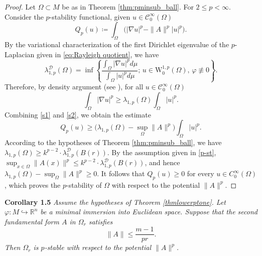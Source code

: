 \documentclass{article}
\begin{document}
\begin{proof}
Let $\Omega \subset M$ be as in Theorem \ref{thm:pminsub_ball}.
For $2 \le p < \infty$. Consider the $p$-stability functional, given $u \in \mathcal{C}_0^\infty(\Omega)$
\begin{equation}\label{s1}
    Q_p(u) \coloneq \int_{\Omega} \Big( |\nabla u|^p - \|A\|^p |u|^p \Big).
\end{equation}
By the variational characterization of the first Dirichlet eigenvalue
of the $p$-Laplacian given in \eqref{eq:Rayleigh quotient}, we have
\[
 \lambda_{1,p}^{\mathcal{D}}(\Omega)
    = \inf \left\{ \frac{\displaystyle \int_{\Omega} |\nabla u |^p d\mu} {\displaystyle \int_{\Omega} |u|^p d\mu}; \, u \in \mathrm{W}^{1,p}_0(\Omega), \, \varphi \not\equiv 0
    \right\}.
\]
Therefore, by density argument (see \cite[Corollary A.4]{le}), for all  $u \in \mathcal{C}_0^\infty(\Omega)$
\begin{equation}\label{s2}
\int_{\Omega} |\nabla u|^p \geq \lambda_{1,p}(\Omega) \int_{\Omega} |u|^p. 
\end{equation}
Combining \eqref{s1} and \eqref{s2}, we obtain the estimate
\[
Q_p(u) \geq \big( \lambda_{1,p}(\Omega) - \sup_{\Omega} \|A\|^p\big)
\int_{\Omega} |u|^p.
\]
According to the hypotheses of Theorem \ref{thm:pminsub_ball}, we have $\lambda_{1,p}(\Omega) \geq k^{p-2} \cdot \lambda_{1,p}^{\mathcal D}(B(r))$. By the assumption given in \eqref{p-st}, $\sup_{x \in \Omega} \|A(x)\|^p \leq k^{p-2} \cdot \lambda_{1,p}^{\mathcal D}(B(r))$, and hence $\lambda_{1,p}(\Omega) - \sup_{\Omega} \|A\|^p \ge 0$. It follows that $Q_p(u) \ge 0$ for every $u \in C_0^\infty(\Omega)$, which proves the $p$-stability of $\Omega$ with respect to the potential $\|A\|^p$. 
\end{proof}
\medskip
\noindent
 \textbf{Corollary 1.5} \textit{Assume the hypotheses of Theorem \ref{thmlowerptone}. Let $\varphi \colon M \hookrightarrow \mathbb{R}^{n}$ be a minimal immersion into Euclidean space. Suppose that the second fundamental form $A$ in $\Omega_r$ satisfies
\begin{equation*}
    \|A\| \leq \frac{m-1}{pr}.
\end{equation*}
Then $\Omega_r$ is $p$-stable with respect to the potential $\|A\|^{p}$.}
\end{document}
